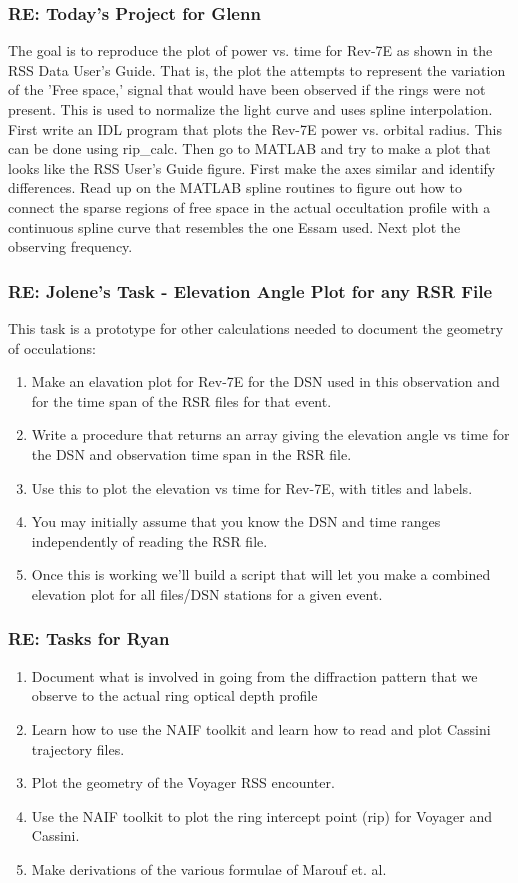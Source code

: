 \documentclass[crop=false,class=book]{standalone}
\begin{document}
\subsubsection{\footnotesize RE: Today's Project for Glenn}
The goal is to reproduce the plot of power vs. time for Rev-7E as shown in the RSS Data User's Guide. That is, the plot the attempts to represent the variation of the 'Free space,' signal that would have been observed if the rings were not present. This is used to normalize the light curve and uses spline interpolation. First write an IDL program that plots the Rev-7E power vs. orbital radius. This can be done using rip\_calc. Then go to MATLAB and try to make a plot that looks like the RSS User's Guide figure. First make the axes similar and identify differences. Read up on the MATLAB spline routines to figure out how to connect the sparse regions of free space in the actual occultation profile with a continuous spline curve that resembles the one Essam used. Next plot the observing frequency.
\subsubsection{\footnotesize RE: Jolene's Task - Elevation Angle Plot for any RSR File}
This task is a prototype for other calculations needed to document the geometry of occulations:
\begin{enumerate}
    \item Make an elavation plot for Rev-7E for the DSN used in this observation and for the time span of the RSR files for that event.
    \item Write a procedure that returns an array giving the elevation angle vs time for the DSN and observation time span in the RSR file.
    \item Use this to plot the elevation vs time for Rev-7E, with titles and labels.
    \item You may initially assume that you know the DSN and time ranges independently of reading the RSR file.
    \item Once this is working we'll build a script that will let you make a combined elevation plot for all files/DSN stations for a given event.
\end{enumerate}
\subsubsection{\footnotesize RE: Tasks for Ryan}
\begin{enumerate}
    \item Document what is involved in going from the diffraction pattern that we observe to the actual ring optical depth profile
    \item Learn how to use the NAIF toolkit and learn how to read and plot Cassini trajectory files.
    \item Plot the geometry of the Voyager RSS encounter.
    \item Use the NAIF toolkit to plot the ring intercept point (rip) for Voyager and Cassini.
    \item Make derivations of the various formulae of Marouf et. al.
\end{enumerate}
\end{document}

